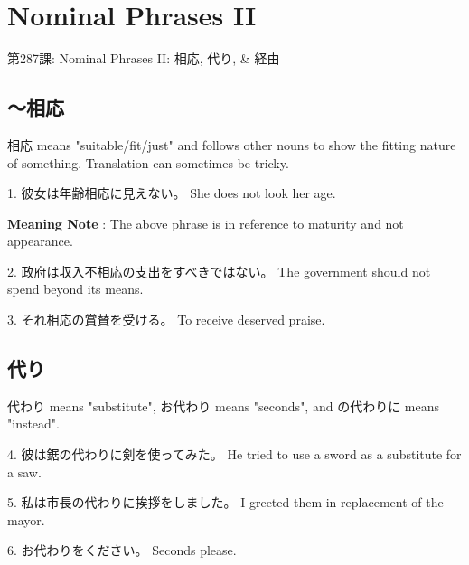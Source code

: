     
\chapter{Nominal Phrases II}

\begin{center}
\begin{Large}
第287課: Nominal Phrases II: 相応, 代り, \& 経由 
\end{Large}
\end{center}
       
\section{～相応}
 
\par{ 相応 means "suitable\slash fit\slash just" and follows other nouns to show the fitting nature of something. Translation can sometimes be tricky. }
 
\par{1. 彼女は年齢相応に見えない。 \hfill\break
She does not look her age. }
 
\par{\textbf{Meaning Note }: The above phrase is in reference to maturity and not appearance. }
 
\par{2. 政府は収入不相応の支出をすべきではない。 \hfill\break
The government should not spend beyond its means. }
 
\par{3. それ相応の賞賛を受ける。 \hfill\break
To receive deserved praise. }
      
\section{代り}
 
\par{ 代わり means "substitute", お代わり means "seconds", and の代わりに means "instead". }
 
\par{4. 彼は鋸の代わりに剣を使ってみた。 \hfill\break
He tried to use a sword as a substitute for a saw. }
 
\par{5. 私は市長の代わりに挨拶をしました。 \hfill\break
I greeted them in replacement of the mayor. }
 
\par{6. お代わりをください。 \hfill\break
Seconds please. }
 
